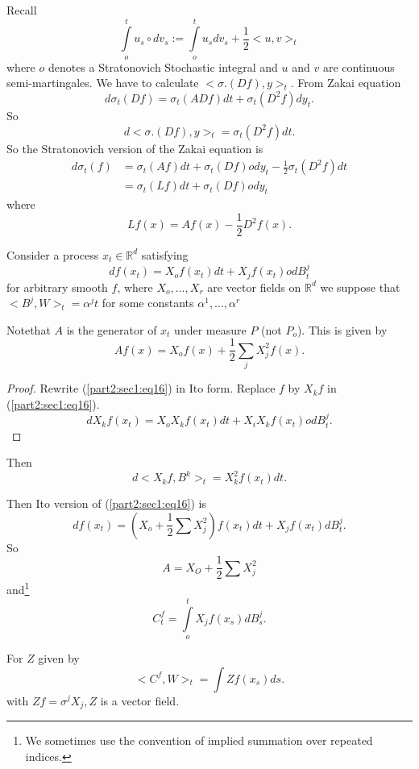 \medskip
{}\pageoriginale 

Recall
$$
\int \limits^t_o u_s \circ dv_s := \int \limits^t_o u_s dv_s +
\frac{1}{2}<u,v>_t 
$$
where $o$ denotes a Stratonovich Stochastic integral and $u$ and $v$
are continuous semi-martingales. We have to calculate
$<\sigma.(Df),y>_t$. From Zakai equation 
$$
d \sigma_t(Df)= \sigma_t(ADf)dt + \sigma _t (D^2 f)dy_t.
$$
So
$$
d < \sigma.(Df), y>_t =  \sigma_t(D^2f)dt.
$$
So the Stratonovich version of the Zakai equation is 
\begin{align*}
  d \sigma_t (f) & = \sigma_t (Af)dt+ \sigma_t (Df) o dy_t-
  \frac{1}{2}\sigma_t (D^2f)dt\\ 
  &= \sigma_t (Lf)dt+\sigma_t (Df)o dy_t
\end{align*}
where
$$
Lf(x)=Af(x)- \frac{1}{2}D^2f(x).
$$

\medskip
{}

Consider a process $x_t \in \mathbb{R}^d$ satisfying
\begin{equation*}
  df(x_t)=X_o f(x_t)dt +X_jf(x_t)o dB_t^j \tag{16}\label{part2:sec1:eq16}
\end{equation*}
for arbitrary smooth $f$, where $X_o, \ldots,X_r$ are vector fields on
$\mathbb{R}^d$ we suppose that $<B^j,W>_t= \alpha ^jt$ for some
constants $\alpha^1,\ldots, \alpha^r$ 

Note\pageoriginale that $A$ is the generator of $x_t$ under measure
$P$ (not $P_o$). This is given by  
$$
Af(x)=X_o f(x)+ \frac{1}{2}\sum_j X^2_j f(x).
$$

\begin{proof}
  Rewrite (\ref{part2:sec1:eq16}) in Ito form. Replace $f$ by $X_kf$
  in (\ref{part2:sec1:eq16}).  
  $$
  dX_kf(x_t)=X_oX_kf(x_t)dt+ X_i X_k f(x_t)o dB^j_t.
  $$
\end{proof}

Then
$$
d<X_kf,B^k>_t= X_k^2f(x_t)dt.
$$

Then Ito version of (\ref{part2:sec1:eq16}) is 
$$
df(x_t)=\left(X_o+ \frac{1}{2}\sum X^2_j \right)f (x_t)dt+X_jf(x_t)dB^j_t.
$$
So
$$
A=X_O+ \frac{1}{2}\sum X^2_j
$$
and\footnote{We sometimes use the convention of implied summation over 
  repeated indices.}  
$$
C^f_t= \int \limits_o^t X_j f(x_s) dB^j_s.
$$

\begin{prop} %
  For $Z$ given by
  $$
  <C^f,W>_t= \int Zf(x_s)ds.
  $$
  with $Zf = \sigma^j X_j, Z$ is a vector field.
\end{prop}

